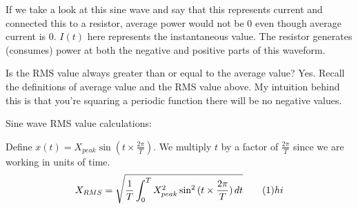 If we take a look at this sine wave and say that this represents current and connected this to a resistor, average power would not be 0 even though average current is 0. $I(t)$ here represents the instantaneous value. The resistor generates (consumes) power at both the negative and positive parts of this waveform.
\begin{center}
\end{center}

\begin{sanity}
    Is the RMS value always greater than or equal to the average value? Yes. Recall the definitions of average value and the RMS value above. My intuition behind this is that you're squaring a periodic function there will be no negative values.
\end{sanity}

Sine wave RMS value calculations:

Define $x(t) = X_{peak} \sin{(t \times \frac{2\pi}{T})}$. We multiply $t$ by a factor of $\frac{2\pi}{T}$ since we are working in units of time.
\begin{equation} 
    X_{RMS} = \sqrt{\frac{1}{T} \int_0^T X_{peak}^2 \sin^2{(t \times \frac{2\pi}{T})} \,dt} \tag{1} \\
    hi
\end{equation}

